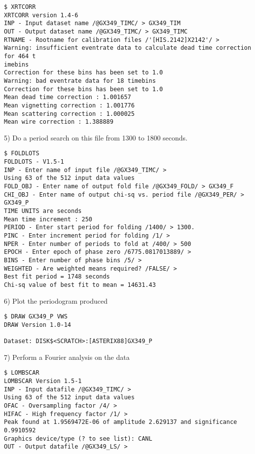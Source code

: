 \begin{verbatim}
$ XRTCORR
XRTCORR version 1.4-6
INP - Input dataset name /@GX349_TIMC/ > GX349_TIM
OUT - Output dataset name /@GX349_TIMC/ > GX349_TIMC
RTNAME - Rootname for calibration files /'[HIS.2142]X2142'/ > 
Warning: insufficient eventrate data to calculate dead time correction for 464 t
imebins
Correction for these bins has been set to 1.0
Warning: bad eventrate data for 18 timebins
Correction for these bins has been set to 1.0
Mean dead time correction : 1.001657
Mean vignetting correction : 1.001776
Mean scattering correction : 1.000025
Mean wire correction : 1.388889
\end{verbatim}

5) Do a period search on this file from 1300 to 1800 seconds.

\begin{verbatim}
$ FOLDLOTS
FOLDLOTS - V1.5-1
INP - Enter name of input file /@GX349_TIMC/ > 
Using 63 of the 512 input data values
FOLD_OBJ - Enter name of output fold file /@GX349_FOLD/ > GX349_F
CHI_OBJ - Enter name of output chi-sq vs. period file /@GX349_PER/ > GX349_P
TIME UNITS are seconds
Mean time increment : 250
PERIOD - Enter start period for folding /1400/ > 1300.
PINC - Enter increment period for folding /1/ > 
NPER - Enter number of periods to fold at /400/ > 500
EPOCH - Enter epoch of phase zero /6775.0817013889/ > 
BINS - Enter number of phase bins /5/ > 
WEIGHTED - Are weighted means required? /FALSE/ > 
Best fit period = 1748 seconds
Chi-sq value of best fit to mean = 14631.43
\end{verbatim}

6) Plot the periodogram produced

\begin{verbatim}
$ DRAW GX349_P VWS
DRAW Version 1.0-14

Dataset: DISK$<SCRATCH>:[ASTERIX88]GX349_P
\end{verbatim}

7) Perform a Fourier analysis on the data

\begin{verbatim}
$ LOMBSCAR
LOMBSCAR Version 1.5-1
INP - Input datafile /@GX349_TIMC/ > 
Using 63 of the 512 input data values
OFAC - Oversampling factor /4/ > 
HIFAC - High frequency factor /1/ > 
Peak found at 1.9569472E-06 of amplitude 2.629137 and significance 0.9910592
Graphics device/type (? to see list): CANL
OUT - Output datafile /@GX349_LS/ > 

\end{verbatim}

